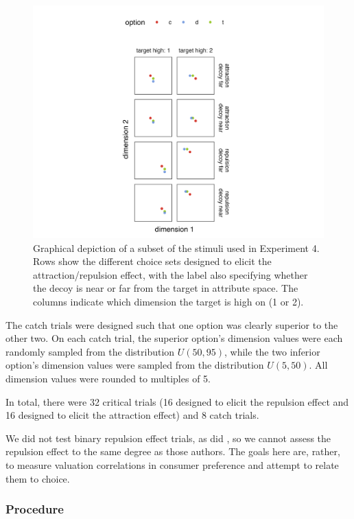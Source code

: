 \begin{figure}
    \includegraphics[width=150mm,scale=0.5]{figures/ce_rating_stim_for_paper.jpeg}
    \caption{Graphical depiction of a subset of the stimuli used in Experiment 4. Rows show the different choice sets designed to elicit the attraction/repulsion effect, with the label also specifying whether the decoy is near or far from the target in attribute space. The columns indicate which dimension the target is high on (1 or 2).}
    \label{fig:ce_rating_stim}
\end{figure}

The catch trials were designed such that one option was clearly superior to the other two. On each catch trial, the superior option's dimension values were each randomly sampled from the distribution $U(50,95)$, while the two inferior option's dimension values were sampled from the distribution $U(5,50)$. All dimension values were rounded to multiples of 5. 

In total, there were 32 critical trials (16 designed to elicit the repulsion effect and 16 designed to elicit the attraction effect) and 8 catch trials.

We did not test binary repulsion effect trials, as did \textcite{banerjeeFactorsThatPromote2024}, so we cannot assess the repulsion effect to the same degree as those authors. The goals here are, rather, to measure valuation correlations in consumer preference and attempt to relate them to choice.

\subsubsection{Procedure}


